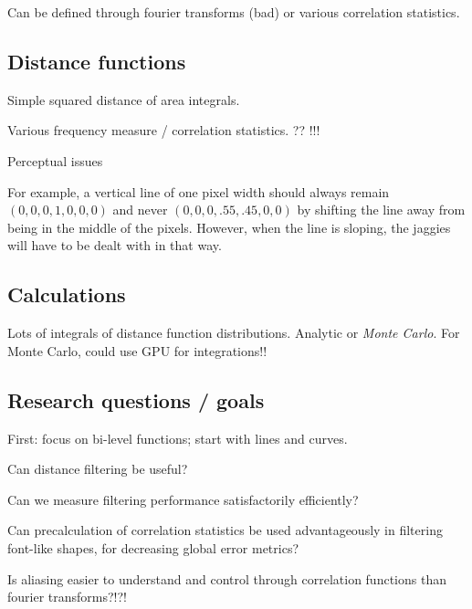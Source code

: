 \documentclass{article}
\begin{document}
Can be defined through fourier transforms (bad) or various
correlation statistics.

\subsection{Distance functions}

Simple squared distance of area integrals.

Various frequency measure / correlation statistics. ?? !!!

Perceptual issues

For example, a vertical line of one pixel width should always remain $(0,0,0,1,0,0,0)$
and never $(0,0,0,.55,.45,0,0)$ by shifting the line away from being
in the middle of the pixels.
However, when the line is sloping, the jaggies will have to be dealt with in that way.

\subsection{Calculations}

Lots of integrals of distance function distributions.
Analytic or \emph{Monte Carlo}. For Monte Carlo, could use 
GPU for integrations!!

\subsection{Research questions / goals}

First: focus on bi-level functions; start with lines and curves.

Can distance filtering be useful?

Can we measure filtering performance satisfactorily efficiently?

Can precalculation of correlation statistics be used advantageously in
filtering font-like shapes, for decreasing global error metrics? 

Is aliasing easier to understand and control through correlation functions
than fourier transforms?!?!
\end{document}
